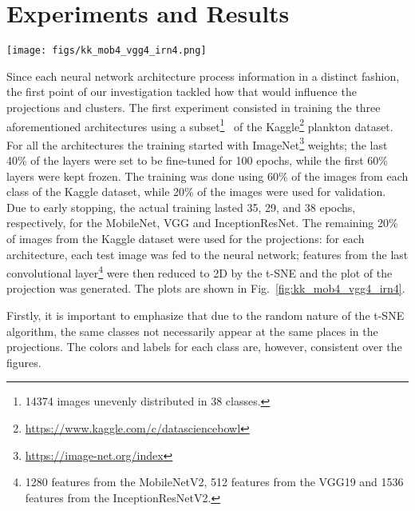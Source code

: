 \documentclass[sn-basic]{sn-jnl}%
\theoremstyle{thmstyleone}%
\theoremstyle{thmstyletwo}%
\theoremstyle{thmstylethree}%
\begin{document}
\section{Experiments and Results}



\begin{figure*}[htb]
\centerline{\texttt{[image: figs/kk\_mob4\_vgg4\_irn4.png]}}
\caption{MobileNet (left) versus VGG (middle) versus InceptionResNet (right). Training and projection using the Kaggle dataset. Last convolutional layer from all architectures used as features.}
\label{fig:kk_mob4_vgg4_irn4}
\end{figure*}

Since each neural network architecture process information in a distinct fashion, the first point of our investigation tackled how that would influence the projections and clusters. The first experiment consisted in training the three aforementioned architectures using a subset\footnote{14374 images unevenly distributed in 38 classes.}~\citep{zheng-paper-kaggle} of the Kaggle\footnote{\url{https://www.kaggle.com/c/datasciencebowl}} plankton dataset. For all the architectures the training started with ImageNet\footnote{\url{https://image-net.org/index}} weights; the last 40\% of the layers were set to be fine-tuned for 100 epochs, while the first 60\% layers were kept frozen. The training was done using 60\% of the images from each class of the Kaggle dataset, while 20\% of the images were used for validation. Due to early stopping, the actual training lasted 35, 29, and 38 epochs, respectively, for the MobileNet, VGG and InceptionResNet. The remaining 20\% of images from the Kaggle dataset were used for the projections: for each architecture, each test image was fed to the neural network; features 
from the last convolutional layer\footnote{1280 features from the MobileNetV2, 512 features from the VGG19 and 1536 features from the InceptionResNetV2.} were then reduced to 2D by the t-SNE and the plot of the projection was generated. The plots are shown in Fig.~\ref{fig:kk_mob4_vgg4_irn4}.

Firstly, it is important to emphasize that due to the random nature of the t-SNE algorithm, the same classes not necessarily appear at the same places in the projections. The colors and labels for each class are, however, consistent over the figures.
\end{document}
